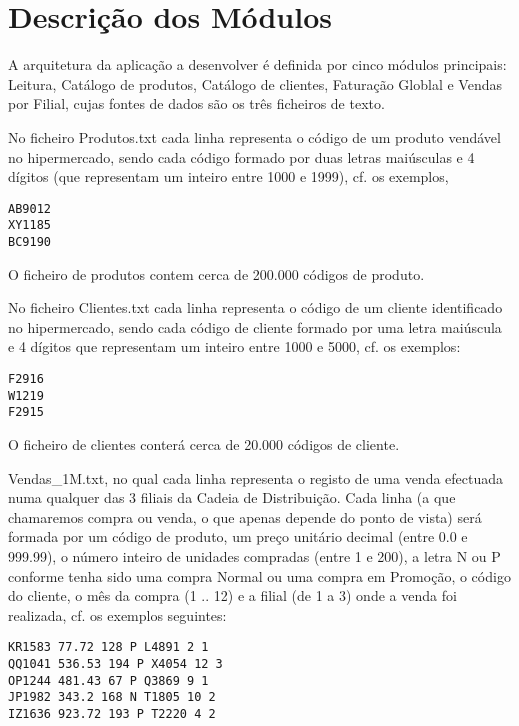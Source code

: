 \chapter{Descrição dos Módulos}

A arquitetura da aplicação a desenvolver é definida por cinco módulos principais: Leitura,  Catálogo de produtos, Catálogo de clientes, Faturação Globlal e Vendas por Filial, cujas fontes de dados são os três ficheiros de texto. 

No ficheiro Produtos.txt cada linha representa o código de um produto vendável no hipermercado, sendo cada código formado por duas letras maiúsculas e 4 dígitos (que representam um inteiro entre 1000 e 1999), cf. os exemplos,

\begin{verbatim}
AB9012
XY1185
BC9190
\end{verbatim}

O ficheiro de produtos contem cerca de 200.000 códigos de produto. 



No ficheiro Clientes.txt cada linha representa o código de um cliente identificado no hipermercado, sendo cada código de cliente formado por uma letra maiúscula e 4 dígitos que representam um inteiro entre 1000 e 5000, cf. os exemplos:

\begin{Verbatim}
F2916
W1219
F2915
\end{Verbatim}

O ficheiro de clientes conterá cerca de 20.000 códigos de cliente. 



 Vendas\_1M.txt, no qual cada linha representa o registo de uma venda efectuada numa qualquer das 3
 filiais da Cadeia de Distribuição. Cada linha (a que chamaremos compra ou venda, o que apenas depende do ponto de vista) será formada por um código de produto, um preço unitário decimal (entre 0.0 e 999.99), o número inteiro de unidades compradas (entre 1 e 200), a letra N ou P conforme tenha sido uma compra Normal ou uma compra em Promoção, o código do cliente, o mês da compra (1 .. 12) e a filial (de 1 a 3) onde a venda foi realizada, cf. os exemplos seguintes:
 
 \begin{Verbatim}
KR1583 77.72 128 P L4891 2 1
QQ1041 536.53 194 P X4054 12 3
OP1244 481.43 67 P Q3869 9 1
JP1982 343.2 168 N T1805 10 2
IZ1636 923.72 193 P T2220 4 2 
 \end{Verbatim}
 
